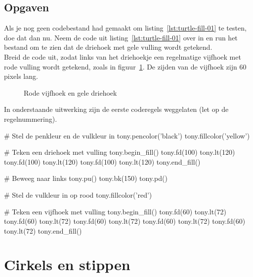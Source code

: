 \documentclass[../main]{subfiles}
\begin{document}
\subsection*{Opgaven}

\begin{opgave}[icons={laptop}]
Als je nog geen codebestand  had gemaakt om listing~\ref{lst:turtle-fill-01} te testen, doe dat dan nu. Neem de code uit listing~\ref{lst:turtle-fill-01} over in  en run het bestand om te zien dat de driehoek met gele vulling wordt getekend.\\
Breid de code uit, zodat links van het driehoekje een regelmatige vijfhoek met rode vulling wordt getekend, zoals in figuur~\ref{fig:turtle-fill-02}. De zijden van de vijfhoek zijn 60 pixels lang.

\begin{figure}[ht]
    \centering
    \caption{Rode vijfhoek en gele driehoek}%
    \label{fig:turtle-fill-02}
\end{figure}
\end{opgave}
\begin{antwoord}
In onderstaande uitwerking zijn de eerste coderegels weggelaten (let op de regelnummering).
\begin{python-breakable}[style=mu-noframe, firstnumber=11]
# Stel de penkleur en de vulkleur in
tony.pencolor('black')
tony.fillcolor('yellow')

# Teken een driehoek met vulling
tony.begin_fill()
tony.fd(100)
tony.lt(120)
tony.fd(100)
tony.lt(120)
tony.fd(100)
tony.lt(120)
tony.end_fill()

# Beweeg naar links
tony.pu()
tony.bk(150)
tony.pd()

# Stel de vulkleur in op rood
tony.fillcolor('red')

# Teken een vijfhoek met vulling
tony.begin_fill()
tony.fd(60)
tony.lt(72)
tony.fd(60)
tony.lt(72)
tony.fd(60)
tony.lt(72)
tony.fd(60)
tony.lt(72)
tony.fd(60)
tony.lt(72)
tony.end_fill()
\end{python-breakable}
\end{antwoord}
\section{Cirkels en stippen}%
\label{sec:cirkels-en-stippen}
\end{document}
